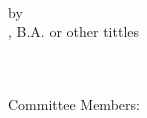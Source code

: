 \doublespacing
\begin{titlepage}
    \begin{center}
        \begingroup
        \myTITLE \\[2.5em]
        \endgroup
        by \\[2.5em]
        \myName, B.A. or other tittles \\[2.2em]
        
        \mySubtitle
        \myDegree \\

        \myTime\\[8.8em]
    \end{center} 
    
    Committee Members: \\
    \indent\indent\indent\myCommitteeOne \\
    \indent\indent\indent\myCommitteeTwo \\
    \indent\indent\indent\myCommitteeThree \\

\end{titlepage}   
